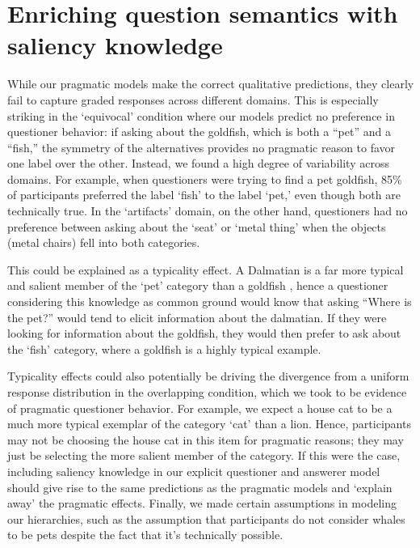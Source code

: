 \documentclass[12pt, floatsintext, jou]{apa6}
\begin{document}
\section{Enriching question semantics with saliency knowledge}

While our pragmatic models make the correct qualitative predictions, they clearly fail to capture graded responses across different domains. This is especially striking in the `equivocal' condition where our models predict no preference in questioner behavior: if asking about the goldfish, which is both a ``pet'' and a ``fish,'' the symmetry of the alternatives provides no pragmatic reason to favor one label over the other. Instead, we found a high degree of variability across domains. For example, when questioners were trying to find a pet goldfish, 85\% of participants preferred the label `fish' to the label `pet,' even though both are technically true. In the `artifacts' domain, on the other hand, questioners had no preference between asking about the `seat' or `metal thing' when the objects (metal chairs) fell into both categories.%

This could be explained as a typicality effect. A Dalmatian is a far more typical and salient member of the `pet' category than a goldfish \cite{Rosch75}, hence a questioner considering this knowledge as common ground would know that asking ``Where is the pet?'' would tend to elicit information about the dalmatian. If they were looking for information about the goldfish, they would then prefer to ask about the `fish' category, where a goldfish is a highly typical example. 

Typicality effects could also potentially be driving the divergence from a uniform response distribution in the overlapping condition, which we took to be evidence of pragmatic questioner behavior. For example, we expect a house cat to be a much more typical exemplar of the category `cat' than a lion. Hence, participants may not be choosing the house cat in this item for pragmatic reasons; they may just be selecting the more salient member of the category. If this were the case, including saliency knowledge in our explicit questioner and answerer model should give rise to the same predictions as the pragmatic models and `explain away' the pragmatic effects. Finally, we made certain assumptions in modeling our hierarchies, such as the assumption that participants do not consider whales to be pets despite the fact that it's technically possible. 
\end{document}
